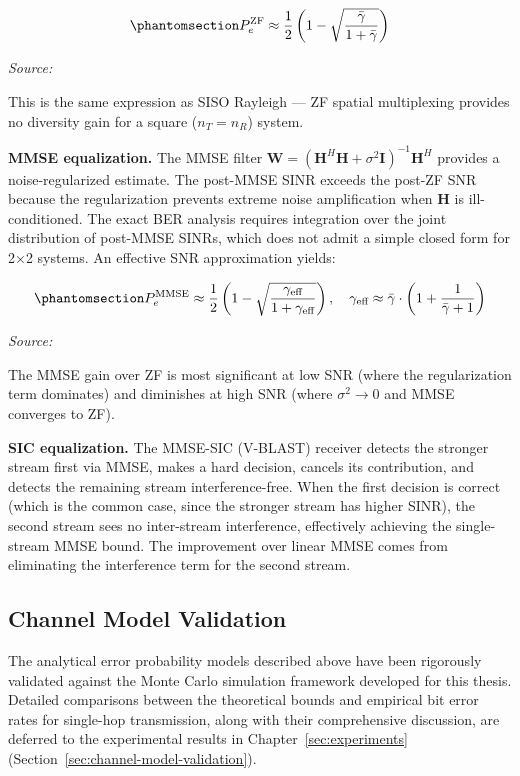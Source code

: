 \begin{equation}\protect\phantomsection\label{eq:zf-ber-mimo}{P_e^{\text{ZF}} \approx \frac{1}{2}\left(1 - \sqrt{\frac{\bar{\gamma}}{1 + \bar{\gamma}}}\right)
}\end{equation} \par{\small\textit{Source: \cite{tse2005fundamentals, zheng2003diversity}}}

This is the same expression as SISO Rayleigh --- ZF spatial multiplexing provides no diversity gain for a square (\(n_T = n_R\)) system.

\textbf{MMSE equalization.} The MMSE filter \(\mathbf{W} = (\mathbf{H}^H\mathbf{H} + \sigma^2\mathbf{I})^{-1}\mathbf{H}^H\) provides a noise-regularized estimate. The post-MMSE SINR exceeds the post-ZF SNR because the regularization prevents extreme noise amplification when \(\mathbf{H}\) is ill-conditioned. The exact BER analysis requires integration over the joint distribution of post-MMSE SINRs, which does not admit a simple closed form for 2×2 systems. An effective SNR approximation yields:

\begin{equation}\protect\phantomsection\label{eq:mmse-ber-mimo}{P_e^{\text{MMSE}} \approx \frac{1}{2}\left(1 - \sqrt{\frac{\gamma_{\text{eff}}}{1 + \gamma_{\text{eff}}}}\right), \quad \gamma_{\text{eff}} \approx \bar{\gamma} \cdot \left(1 + \frac{1}{\bar{\gamma} + 1}\right)
}\end{equation} \par{\small\textit{Source: \cite{tse2005fundamentals, tse1999linear}}}

The MMSE gain over ZF is most significant at low SNR (where the regularization term dominates) and diminishes at high SNR (where \(\sigma^2 \to 0\) and MMSE converges to ZF).

\textbf{SIC equalization.} The MMSE-SIC (V-BLAST) receiver detects the stronger stream first via MMSE, makes a hard decision, cancels its contribution, and detects the remaining stream interference-free. When the first decision is correct (which is the common case, since the stronger stream has higher SINR), the second stream sees no inter-stream interference, effectively achieving the single-stream MMSE bound. The improvement over linear MMSE comes from eliminating the interference term for the second stream.


\subsection{Channel Model Validation}
The analytical error probability models described above have been rigorously validated against the Monte Carlo simulation framework developed for this thesis. Detailed comparisons between the theoretical bounds and empirical bit error rates for single-hop transmission, along with their comprehensive discussion, are deferred to the experimental results in Chapter~\ref{sec:experiments} (Section~\ref{sec:channel-model-validation}).

